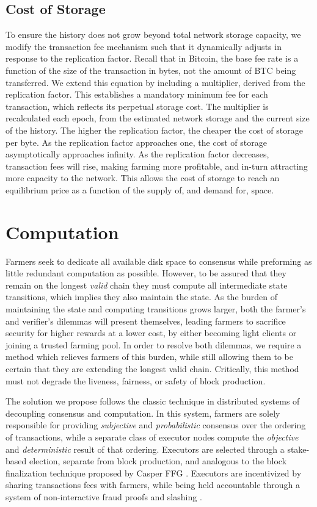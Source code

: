 \documentclass[conference]{IEEEtran}
\begin{document}
\subsection{Cost of Storage}

To ensure the history does not grow beyond total network storage capacity, we modify the transaction fee mechanism such that it dynamically adjusts in response to the replication factor. Recall that in Bitcoin, the base fee rate is a function of the size of the transaction in bytes, not the amount of BTC being transferred. We extend this equation by including a multiplier, derived from the replication factor. This establishes a mandatory minimum fee for each transaction, which reflects its perpetual storage cost. The multiplier is recalculated each epoch, from the estimated network storage and the current size of the history. The higher the replication factor, the cheaper the cost of storage per byte. As the replication factor approaches one, the cost of storage asymptotically approaches infinity. As the replication factor decreases, transaction fees will rise, making farming more profitable, and in-turn attracting more capacity to the network. This allows the cost of storage to reach an equilibrium price as a function of the supply of, and demand for, space. 

\section{Computation}

Farmers seek to dedicate all available disk space to consensus while preforming as little redundant computation as possible. However, to be assured that they remain on the longest \textit{valid} chain they must compute all intermediate state transitions, which implies they also maintain the state. As the burden of maintaining the state and computing transitions grows larger, both the farmer’s and verifier’s dilemmas will present themselves, leading farmers to sacrifice security for higher rewards at a lower cost, by either becoming light clients or joining a trusted farming pool. In order to resolve both dilemmas, we require a method which relieves farmers of this burden, while still allowing them to be certain that they are extending the longest valid chain. Critically, this method must not degrade the liveness, fairness, or safety of block production.

The solution we propose follows the classic technique in distributed systems of decoupling consensus and computation. In this system, farmers are solely responsible for providing \textit{subjective} and \textit{probabilistic} consensus over the ordering of transactions, while a separate class of executor nodes  compute the \textit{objective} and \textit{deterministic} result of that ordering. Executors are selected through a stake-based election, separate from block production, and analogous to the block finalization technique proposed by Casper FFG \cite{buterin2017casper}. Executors are incentivized by sharing transactions fees with farmers, while being held accountable through a system of non-interactive fraud proofs \cite{al2018fraud} and slashing \cite{buterin_2014}. 
\end{document}
